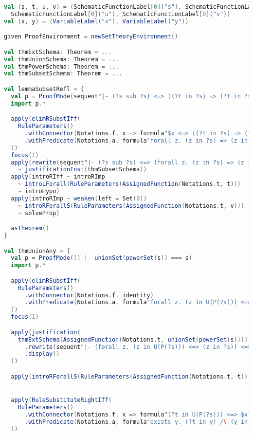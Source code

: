 \newpage
\begin{lstlisting}[language=Scala,basicstyle=\fontsize{2.5}{4}\selectfont,caption={[Sample proof (front)]{Example of a proof written in the front. The generated kernel proof is shown in \autoref{fig:lisa-proof-sample}.}},label={fig:scala-proof-sample},captionpos=b]
val (s, t, u, v) = (SchematicFunctionLabel[0]("s"), SchematicFunctionLabel[0]("t"),
  SchematicFunctionLabel[0]("u"), SchematicFunctionLabel[0]("v"))
val (x, y) = (VariableLabel("x"), VariableLabel("y"))

given ProofEnvironment = newSetTheoryEnvironment()

val thmExtSchema: Theorem = ...
val thmUnionSchema: Theorem = ...
val thmPowerSchema: Theorem = ...
val thmSubsetSchema: Theorem = ...

val lemmaSubsetRefl = {
  val p = ProofMode(sequent"|- (?s sub ?s) <=> ((?t in ?s) => (?t in ?s))")
  import p.*

  apply(elimRSubstIff(
    RuleParameters()
      .withConnector(Notations.f, x => formula"$x <=> ((?t in ?s) => (?t in ?s))")
      .withPredicate(Notations.a, formula"forall z. (z in ?s) => (z in ?s)")
  ))
  focus(1)
  apply(rewrite(sequent"|- (?s sub ?s) <=> (forall z. (z in ?s) => (z in ?s))")
    ~ justificationInst(thmSubsetSchema))
  apply(introRIff ~ introRImp
    ~ introLForall(RuleParameters(AssignedFunction(Notations.t, t)))
    ~ introHypo)
  apply(introRImp ~ weaken(left = Set(0))
    ~ introRForallS(RuleParameters(AssignedFunction(Notations.t, v)))
    ~ solveProp)

  asTheorem()
}

val thmUnionAny = {
  val p = ProofMode(() |- unionSet(powerSet(s)) === s)
  import p.*

  apply(elimRSubstIff(
    RuleParameters()
      .withConnector(Notations.f, identity)
      .withPredicate(Notations.a, formula"forall z. (z in U(P(?s))) <=> (z in ?s)")
  ))
  focus(1)

  apply(justification(
    thmExtSchema(AssignedFunction(Notations.t, unionSet(powerSet(s))))(AssignedFunction(Notations.u, s))
      .rewrite(sequent"|- (forall z. (z in U(P(?s))) <=> (z in ?s)) <=> (U(P(?s)) = ?s)")
      .display()
  ))

  apply(introRForallS(RuleParameters(AssignedFunction(Notations.t, t))))


  apply(RuleSubstituteRightIff(
    RuleParameters()
      .withConnector(Notations.f, x => formula"(?t in U(P(?s))) <=> $x")
      .withPredicate(Notations.a, formula"exists y. (?t in y) /\ (y in P(?s))")
  ))


\end{lstlisting}
